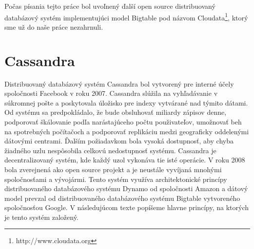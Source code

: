 \documentclass[11pt,twoside,a4paper]{book}
\begin{document}
Počas písania tejto práce bol uvoľnený ďalší open source distribuovaný databázový systém implementujúci model Bigtable pod názvom Cloudata\footnote{http://www.cloudata.org}, ktorý sme už do naše práce nezahrnuli.




\chapter{Cassandra}


Distribuovaný databázový systém Cassandra bol vytvorený pre interné účely spoločnosti Facebook v roku 2007. Cassandra slúžila na vyhľadávanie v súkromnej pošte a poskytovala úložisko pre indexy vytvárané nad týmito dátami. Od systému sa predpokládalo, že bude obsluhovať miliardy zápisov denne, podporovať škálovanie podľa narástajúceho počtu použivateľov, umožnovať beh na spotrebných počítačoch a podporovať replikáciu medzi geograficky oddelenými dátovými centrami. Ďalším požiadavkom bola vysoká dostupnosť, aby chyba žiadného uzlu nespôsobila celkovú nedostupnosť systému. Cassandra je decentralizovaný systém, kde každý uzol vykonáva tie isté operácie. V roku 2008 bola zverejnená ako open source projekt a je neustále vyvíjaná mnohými spoločnosťami a vývojármi. Tento systém využíva architektonické princípy distribuovaného databázového systému Dynamo \cite{decandia2007dynamo} od spoločnosti Amazon a dátový model prevzal od distribuovaného databázového systému Bigtable vytvoreného spoločnosťou Google. V následujúcom texte popíšeme hlavne princípy, na ktorých je tento systém založený.
\end{document}
